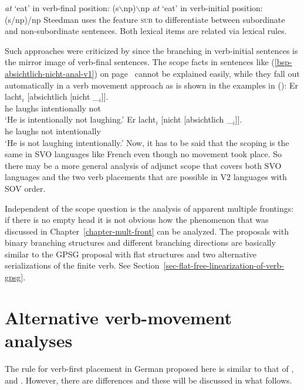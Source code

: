 \begin{exe}
\begin{xlist}
\eal
\ex \emph{at} `eat' in verb-final position: (s$\backslash$np)$\backslash$np
\ex \emph{at} `eat' in verb-initial position: (s/np)/np
\zl
Steedman uses the feature \textsc{sub} to differentiate between subordinate and non-subordinate
sentences. Both lexical items are related via lexical rules.

Such approaches were criticized by \citet{Netter92} since the branching in verb-initial sentences
is the mirror image of verb-final sentences. The scope facts in sentences like (\ref{bsp-absichtlich-nicht-anal-v1}) on
page~\pageref{bsp-absichtlich-nicht-anal-v1} cannot be explained easily, while they fall out
automatically in a verb movement approach as is shown in the examples in ():
\eal
\label{bsp-absichtlich-nicht-anal-v1-zwei}
\ex 
\gll Er lacht$_i$ [absichtlich [nicht \_$_i$]].\\
     he laughs \spacebr{}intentionally \spacebr{}not\\
\glt `He is intentionally not laughing.'
\ex 
\gll Er lacht$_i$  [nicht [absichtlich \_$_i$]].\\
     he laughs \spacebr{}not \spacebr{}intentionally\\
\glt `He is not laughing intentionally.'
\zl{}
Now, it has to be said that the scoping is the same in SVO languages like French even though no
movement took place. So there may be a more general analysis of adjunct scope that covers both SVO
languages and the two verb placements that are possible in V2 languages with SOV order.

Independent of the scope question is the analysis of apparent multiple frontings: if there is no
empty head it is not obvious how the phenomenon that was discussed in
Chapter~\ref{chapter-mult-front} can be analyzed. The proposals with binary branching structures and
different branching directions are basically similar to the GPSG proposal with flat structures and
two alternative serializations of the finite verb. See Section~\ref{sec-flat-free-linearization-of-verb-gpsg}.


\section{Alternative verb-movement analyses}
\label{sec-alternative-verbbewegung}
\label{sec-kopfbewegung-vs-fernabhaengigkeit}

The rule for verb-first placement in German proposed here is similar to that of
\citet{KW91a}, \citet[Chapter~2.2.4.2]{Kiss95a} and \citet{Frank94}. However, there are differences
and these will be discussed in what follows.


\end{xlist}
\end{exe}
